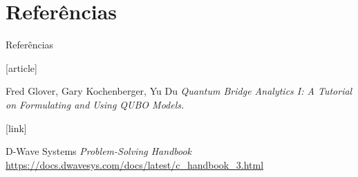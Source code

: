 \documentclass[brazil, MathSerif, aspectratio = 169]{beamer}
\begin{document}
\section{Referências}
\begin{frame}%
    {Referências}

    \begin{thebibliography}{}

        [article]

        Fred Glover, Gary Kochenberger, Yu Du
        \newblock \emph{Quantum Bridge Analytics I: A Tutorial on Formulating and Using QUBO Models.}




        [link]

        D-Wave Systems
        \newblock \emph{Problem-Solving Handbook}
        \newblock \url{https://docs.dwavesys.com/docs/latest/c_handbook_3.html}

    \end{thebibliography}
\end{frame}
\end{document}
